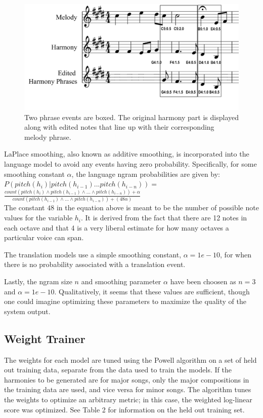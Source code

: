 \documentclass{sig-alternate}
\begin{document}
\begin{figure}
	\includegraphics[scale=0.08]{./phrase_examples.png}
	\caption{Two phrase events are boxed. The original harmony part is displayed along with edited notes that line up with their corresponding melody phrase.}
\end{figure} 

LaPlace smoothing, also known as additive smoothing, is incorporated into the language model to avoid any events having zero probability. Specifically, for some smoothing constant $\alpha$, the language ngram probabilities are given by: \\

$P(pitch(h_{i}) | pitch(h_{i - 1}) ... pitch(h_{i - n})) = $\\

$\frac{count(pitch(h_{i}) \wedge pitch(h_{i - 1}) \wedge ... \wedge pitch(h_{i - n})) + \alpha}{count(pitch(h_{i - 1}) \wedge ... \wedge pitch(h_{i - n})) + (48\alpha)}$\\

The constant $48$ in the equation above is meant to be the number of possible note values for the variable $h_{i}$. It is derived from the fact that there are 12 notes in each octave and that 4 is a very liberal estimate for how many octaves a particular voice can span. 

The translation models use a simple smoothing constant, $\alpha = 1e-10$, for when there is no probability associated with a translation event.

Lastly, the ngram size $n$ and smoothing parameter $\alpha$ have been choosen as $n = 3$ and $\alpha = 1e-10$. Qualitatively, it seems that these values are sufficient, though one could imagine optimizing these parameters to maximize the quality of the system output.

\subsection{Weight Trainer}
The weights for each model are tuned using the Powell algorithm \cite{Koehn:2010:SMT:1734086} on a set of held out training data, separate from the data used to train the models. If the harmonies to be generated are for major songs, only the major compositions in the training data are used, and vice versa for minor songs. The algorithm tunes the weights to optimize an arbitrary metric; in this case, the weighted log-linear score was optimized. See Table 2 for information on the held out training set. 
\end{document}
